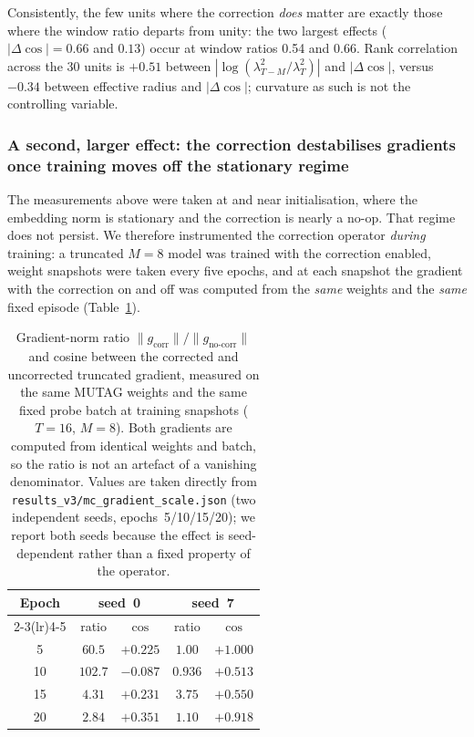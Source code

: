 \documentclass[a4paper,fleqn]{cas-dc}
\begin{document}
Consistently, the few units where the correction \emph{does} matter are exactly those where the window ratio departs from unity: the two largest effects ($|\Delta\cos| = 0.66$ and $0.13$) occur at window ratios 0.54 and 0.66. Rank correlation across the 30 units is $+0.51$ between $|\log(\lambda_{T-M}^2/\lambda_T^2)|$ and $|\Delta\cos|$, versus $-0.34$ between effective radius and $|\Delta\cos|$; curvature as such is not the controlling variable.

\subsubsection{A second, larger effect: the correction destabilises gradients once training moves off the stationary regime}

The measurements above were taken at and near initialisation, where the
embedding norm is stationary and the correction is nearly a no-op. That
regime does not persist. We therefore instrumented the correction
operator \emph{during} training: a truncated $M{=}8$ model was trained
with the correction enabled, weight snapshots were taken every five
epochs, and at each snapshot the gradient with the correction on and off
was computed from the \emph{same} weights and the \emph{same} fixed
episode (Table~\ref{tab:mc_training_grad}).

\begin{table}[htbp]
\centering\footnotesize
\caption{Gradient-norm ratio $\lVert g_{\text{corr}}\rVert/\lVert g_{\text{no-corr}}\rVert$
and cosine between the corrected and uncorrected truncated gradient, measured
on the same MUTAG weights and the same fixed probe batch at training snapshots
($T{=}16$, $M{=}8$). Both gradients are computed from identical weights and
batch, so the ratio is not an artefact of a vanishing denominator. Values are
taken directly from \texttt{results\_v3/mc\_gradient\_scale.json} (two independent
seeds, epochs~5/10/15/20); we report both seeds because the effect is
seed-dependent rather than a fixed property of the operator.}
\label{tab:mc_training_grad}
\begin{tabular}{@{}ccccc@{}}
\toprule
Epoch & \multicolumn{2}{c}{seed~0} & \multicolumn{2}{c}{seed~7} \\
\cmidrule(lr){2-3}\cmidrule(lr){4-5}
 & ratio & $\cos$ & ratio & $\cos$ \\
\midrule
5  & $60.5$  & $+0.225$ & $1.00$  & $+1.000$ \\
10 & $102.7$ & $-0.087$ & $0.936$ & $+0.513$ \\
15 & $4.31$  & $+0.231$ & $3.75$  & $+0.550$ \\
20 & $2.84$  & $+0.351$ & $1.10$  & $+0.918$ \\
\bottomrule
\end{tabular}
\end{table}
\end{document}
